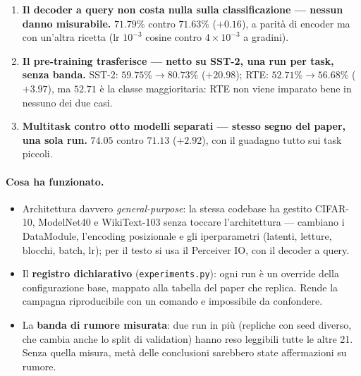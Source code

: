 \documentclass[
  11pt,
]{article}
\begin{document}
\begin{enumerate}
\item \textbf{Il decoder a query non costa nulla sulla classificazione --- nessun danno misurabile.} $71.79\%$ contro $71.63\%$ ($+0.16$), a parità di encoder ma con un'altra ricetta (lr $10^{-3}$ cosine contro $4\times10^{-3}$ a gradini).
\item \textbf{Il pre-training trasferisce --- netto su SST-2, una run per task, senza banda.} SST-2: $59.75\% \to 80.73\%$ ($+20.98$); RTE: $52.71\% \to 56.68\%$ ($+3.97$), ma $52.71$ è la classe maggioritaria: RTE non viene imparato bene in nessuno dei due casi.
\item \textbf{Multitask contro otto modelli separati --- stesso segno del paper, una sola run.} $74.05$ contro $71.13$ ($+2.92$), con il guadagno tutto sui task piccoli.
\end{enumerate}

\paragraph{Cosa ha funzionato.}
\begin{itemize}
\item Architettura davvero \emph{general-purpose}: la stessa codebase ha gestito CIFAR-10, ModelNet40 e WikiText-103 senza toccare l'architettura --- cambiano i DataModule, l'encoding posizionale e gli iperparametri (latenti, letture, blocchi, batch, lr); per il testo si usa il Perceiver IO, con il decoder a query.
\item Il \textbf{registro dichiarativo} (\texttt{experiments.py}): ogni run è un override della configurazione base, mappato alla tabella del paper che replica. Rende la campagna riproducibile con un comando e impossibile da confondere.
\item La \textbf{banda di rumore misurata}: due run in più (repliche con seed diverso, che cambia anche lo split di validation) hanno reso leggibili tutte le altre 21. Senza quella misura, metà delle conclusioni sarebbero state affermazioni su rumore.
\end{itemize}
\end{document}
